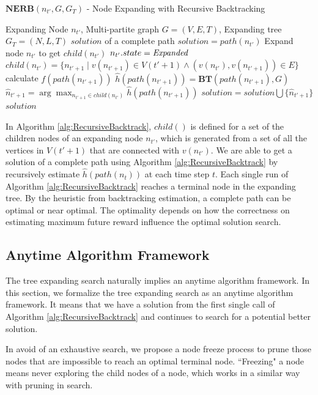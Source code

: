 \documentclass[12pt]{article}
\begin{document}
\begin{algorithm}
\caption{ $ \mathbf{NERB}( n_{t'}, G, G_{T} ) $ - Node Expanding with Recursive Backtracking }
\label{alg:RecursiveBacktrack}
\begin{algorithmic}[1]
\REQUIRE 
Expanding Node $ n_{t'} $, Multi-partite graph $ G = (V, E, T) $, Expanding tree $ G_{T} = (N, L, T) $
\ENSURE $ solution $ of a complete path
\STATE $ solution = path(n_{t'}) $ 
\STATE  Expand node $ n_{t'} $ to get $ child(n_{t'}) $
\STATE  $ n_{t'}.state = \mbox{\emph{Expanded}} $
\STATE  $ child(n_{t'}) = \{ n_{t'+1} \mid v(n_{t'+1}) \in V(t'+1) \land (v(n_{t'}), v(n_{t'+1})) \in E  \} $
\STATE  calculate $ f(path(n_{t'+1})) $
\STATE  $ \hat{h}(path(n_{t'+1})) = \mathbf{BT}( path(n_{t'+1}) , G ) $
\ENDFOR
\STATE  $ \hat{n}_{t'+1} = \arg \max_{n_{t'+1} \in child(n_{t'})} \hat{h}(path(n_{t'+1})) $
\STATE  $ solution = solution \bigcup \{ \hat{n}_{t'+1} \} $
\ENDFOR 
\RETURN $ solution $
\end{algorithmic}
\end{algorithm}

In Algorithm \ref{alg:RecursiveBacktrack}, $ child() $ is defined for a set of the children nodes of an expanding node $ n_{t'} $, which is generated from a set of all the vertices in $ V(t'+1) $ that are connected with $ v(n_{t'}) $.
We are able to get a solution of a complete path using Algorithm \ref{alg:RecursiveBacktrack} by recursively estimate $ \hat{h}(path(n_{t})) $ at each time step $ t $.
Each single run of Algorithm \ref{alg:RecursiveBacktrack} reaches a terminal node in the expanding tree.
By the heuristic from backtracking estimation, a complete path can be optimal or near optimal.
The optimality depends on how the correctness on estimating maximum future reward influence the optimal solution search.

\subsection{Anytime Algorithm Framework}
\label{subsec:anytime_algorithm_framework}

The tree expanding search naturally implies an anytime algorithm framework. 
In this section, we formalize the tree expanding search as an anytime algorithm framework.
It means that we have a solution from the first single call of Algorithm \ref{alg:RecursiveBacktrack} and continues to search for a potential better solution. 

In avoid of an exhaustive search, we propose a node freeze process to prune those nodes that are impossible to reach an optimal terminal node. ``Freezing" a node means never exploring the child nodes of a node, which works in a similar way with pruning in search. 
\end{document}
